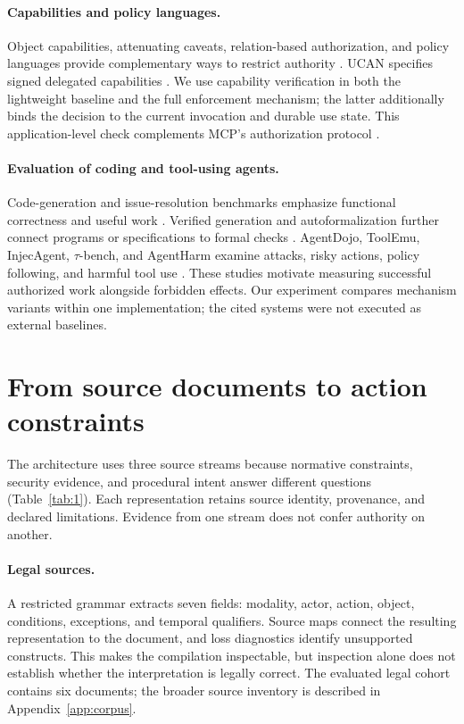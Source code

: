 \documentclass{article}
\begin{document}
\paragraph{Capabilities and policy languages.}
Object capabilities, attenuating caveats, relation-based authorization, and policy languages provide complementary ways to restrict authority \citep{miller2006robust,birgisson2014macaroons,pang2019zanzibar,cutler2024cedar}. UCAN specifies signed delegated capabilities \citep{ucan}. We use capability verification in both the lightweight baseline and the full enforcement mechanism; the latter additionally binds the decision to the current invocation and durable use state. This application-level check complements MCP's authorization protocol \citep{mcp-auth}.

\paragraph{Evaluation of coding and tool-using agents.}
Code-generation and issue-resolution benchmarks emphasize functional correctness and useful work \citep{chen2021codex,jimenez2024swebench}. Verified generation and autoformalization further connect programs or specifications to formal checks \citep{sun2024clover,yang2023leandojo,wu2022autoformalization}. AgentDojo, ToolEmu, InjecAgent, $\tau$-bench, and AgentHarm examine attacks, risky actions, policy following, and harmful tool use \citep{debenedetti2024agentdojo,ruan2024toolemu,zhan2024injecagent,yao2024taubench,andriushchenko2025agentharm}. These studies motivate measuring successful authorized work alongside forbidden effects. Our experiment compares mechanism variants within one implementation; the cited systems were not executed as external baselines.

\section{From source documents to action constraints}
\label{sec:sources}

The architecture uses three source streams because normative constraints, security evidence, and procedural intent answer different questions (Table~\ref{tab:1}). Each representation retains source identity, provenance, and declared limitations. Evidence from one stream does not confer authority on another.



\paragraph{Legal sources.}
A restricted grammar extracts seven fields: modality, actor, action, object, conditions, exceptions, and temporal qualifiers. Source maps connect the resulting representation to the document, and loss diagnostics identify unsupported constructs. This makes the compilation inspectable, but inspection alone does not establish whether the interpretation is legally correct. The evaluated legal cohort contains six documents; the broader source inventory is described in Appendix~\ref{app:corpus}.
\end{document}
